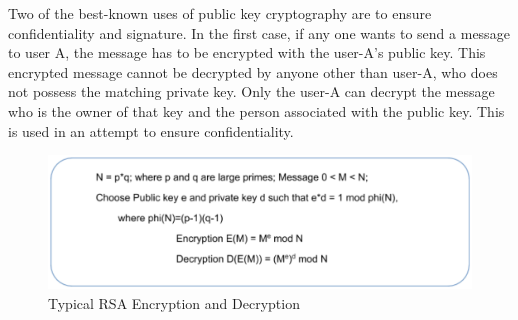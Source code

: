 \begin{multicols}{2}
Two of the best-known uses of public key cryptography are to ensure confidentiality and signature. In the first case, if any one wants to send a message to user A, the message has to be encrypted with the user-A's public key. This encrypted message cannot be decrypted by anyone other than user-A, who does not possess the matching private key. Only the user-A can decrypt the message who is the owner of that key and the person associated with the public key. This is used in an attempt to ensure confidentiality.
\end{multicols}

\begin{figure}[!ht]
\centering
\includegraphics[scale=.9]{src/Figures/chap2/4.eps}
\caption{Typical RSA Encryption and Decryption}\label{chap2-fig4}
\end{figure}

